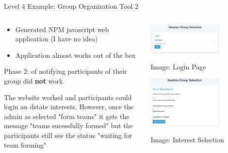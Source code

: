 \documentclass[xcolor=dvipsnames, aspectratio=169]{beamer}
\begin{document}
\begin{frame}{Level 4 Example: Group Organization Tool 2}
  \begin{columns}[T]
    \begin{column}{0.5\textwidth}
      \begin{itemize}
          \item Generated NPM javascript web application (I have no idea)
          \item Application almost works out of the box
      \end{itemize}
      \begin{alertbox}\small
          Phase 2: of notifying participants of their group did \textbf{not} work
      \end{alertbox}
      \begin{promptbox}\small
        The website worked and participants could login an dstate interests. However, once the admin as selected "form teams" it gets the message "teams sucessfully formed" but the participants still see the status "waiting for team forming"
      \end{promptbox}
    \end{column}
    \begin{column}{0.5\textwidth}
        
      \centering\includegraphics[width=0.7\textwidth]{images/GroupOrg.png}
      \tiny\centerline{Image: Login Page}
      \centering\includegraphics[width=0.7\textwidth]{images/GroupOrg2.png}
      \tiny\centerline{Image: Interest Selection}
    \end{column}
  \end{columns}
  
\end{frame}
\end{document}
